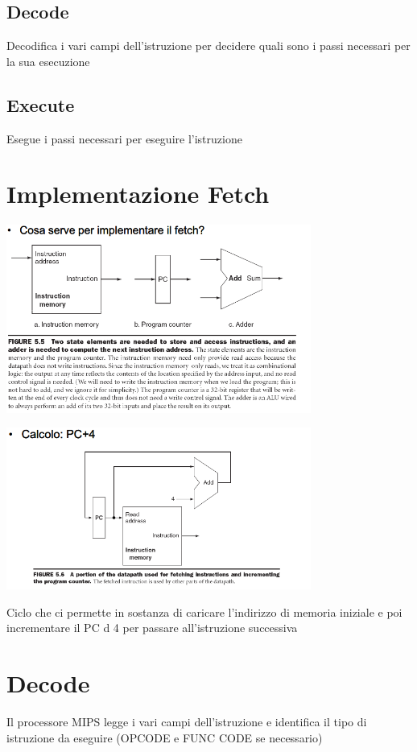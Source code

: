 \documentclass[12pt, a4paper, openany]{book}
\begin{document}
\subsection*{Decode}
Decodifica i vari campi dell'istruzione per decidere quali sono i passi necessari
per la sua esecuzione

\subsection*{Execute}
Esegue i passi necessari per eseguire l'istruzione

\section{Implementazione Fetch}
\begin{center}
    \includegraphics[width=100mm, scale=0.5]{Implementazione fetch.png}
\end{center}
\begin{center}
    \includegraphics[width=100mm, scale=0.5]{Fetch PC+4.png}
\end{center}
Ciclo che ci permette in sostanza di caricare l'indirizzo di memoria iniziale e
poi incrementare il PC d 4 per passare all'istruzione successiva
\section*{Decode}
Il processore MIPS legge i vari campi dell'istruzione e identifica il tipo di istruzione
da eseguire (OPCODE e FUNC CODE se necessario)
\end{document}
